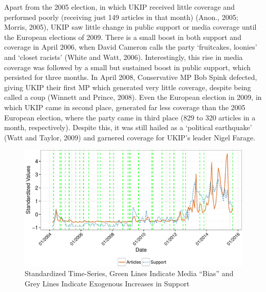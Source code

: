 \documentclass[12pt,article]{article}
\begin{document}
Apart from the 2005 election, in which UKIP received little coverage and
performed poorly (receiving just 149 articles in that month) (Anon.,
2005; Morris, 2005), UKIP saw little change in public support or media
coverage until the European elections of 2009. There is a small boost in
both support and coverage in April 2006, when David Cameron calls the
party `fruitcakes, loonies' and `closet racists' (White and Watt, 2006).
Interestingly, this rise in media coverage was followed by a small but
sustained boost in public support, which persisted for three months. In
April 2008, Conservative MP Bob Spink defected, giving UKIP their first
MP which generated very little coverage, despite being called a coup
(Winnett and Prince, 2008). Even the European election in 2009, in which
UKIP came in second place, generated far less coverage than the 2005
European election, where the party came in third place (829 to 320
articles in a month, respectively). Despite this, it was still hailed as
a `political earthquake' (Watt and Taylor, 2009) and garnered coverage
for UKIP's leader Nigel Farage.

\begin{figure}[htbp]
\centering
\includegraphics{ukip_media_files/figure-latex/unnamed-chunk-9-1.pdf}
\caption{Standardized Time-Series, Green Lines Indicate Media ``Bias''
and Grey Lines Indicate Exogenous Increases in Support}
\end{figure}
\end{document}
